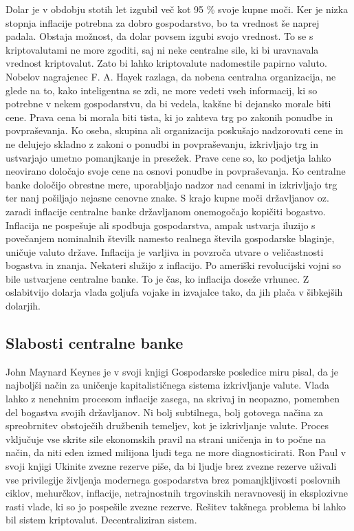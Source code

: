 \documentclass[letterpaper, titlepage, freqn]{article}
\begin{document}
 Dolar je v obdobju stotih let izgubil več kot 95 \% svoje kupne moči. Ker je nizka stopnja inflacije potrebna za dobro gospodarstvo, bo ta vrednost še naprej padala. Obstaja možnost, da dolar povsem izgubi svojo vrednost. To se s kriptovalutami ne more zgoditi, saj ni neke centralne sile, ki bi uravnavala vrednost kriptovalut. Zato bi lahko kriptovalute nadomestile papirno valuto.
Nobelov nagrajenec F. A. Hayek razlaga, da nobena centralna organizacija, ne glede na to, kako inteligentna se zdi, ne more vedeti vseh informacij, ki so potrebne v nekem gospodarstvu, da bi vedela, kakšne bi dejansko morale biti cene. Prava cena bi morala biti tista, ki jo zahteva trg po zakonih ponudbe in povpraševanja. Ko oseba, skupina ali organizacija poskušajo nadzorovati cene in ne delujejo skladno z zakoni o ponudbi in povpraševanju, izkrivljajo trg in ustvarjajo umetno pomanjkanje in presežek. Prave cene so, ko podjetja lahko neovirano določajo svoje cene na osnovi ponudbe in povpraševanja. Ko centralne banke določijo obrestne mere, uporabljajo nadzor nad cenami in izkrivljajo trg ter nanj pošiljajo nejasne cenovne znake.
S krajo kupne moči državljanov oz. zaradi inflacije centralne banke državljanom onemogočajo kopičiti bogastvo. Inflacija ne pospešuje ali spodbuja gospodarstva, ampak ustvarja iluzijo s povečanjem nominalnih številk namesto realnega števila gospodarske blaginje, uničuje valuto države. Inflacija je varljiva in povzroča utvare o veličastnosti bogastva in znanja. Nekateri služijo z inflacijo. Po ameriški revolucijski vojni so bile ustvarjene centralne banke. To je čas, ko inflacija doseže vrhunec. Z oslabitvijo dolarja vlada goljufa vojake in izvajalce tako, da jih plača v šibkejših dolarjih.\\

\subsection{Slabosti centralne banke}

John Maynard Keynes je v svoji knjigi Gospodarske posledice miru pisal, da je najboljši način za uničenje kapitalističnega sistema izkrivljanje valute. Vlada lahko z nenehnim procesom inflacije zasega, na skrivaj in neopazno, pomemben del bogastva svojih državljanov. Ni bolj subtilnega, bolj  gotovega načina za spreobrnitev obstoječih družbenih temeljev, kot je izkrivljanje valute. Proces vključuje vse skrite sile ekonomskih pravil na strani uničenja in to počne na način, da niti eden izmed milijona ljudi tega ne more diagnosticirati.
Ron Paul v svoji knjigi Ukinite zvezne rezerve piše, da bi ljudje brez zvezne rezerve uživali vse privilegije življenja modernega gospodarstva brez pomanjkljivosti poslovnih ciklov, mehurčkov, inflacije, netrajnostnih trgovinskih neravnovesij in eksplozivne rasti vlade, ki so jo pospešile zvezne rezerve.
Rešitev takšnega problema bi lahko bil sistem kriptovalut. Decentraliziran sistem.\\
\end{document}

